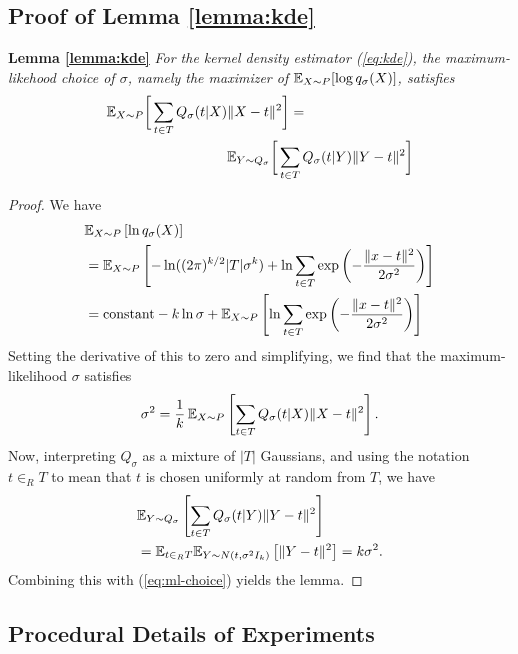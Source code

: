\subsection{Proof of Lemma \ref{lemma:kde}} 
\label{sec:appendix kde lemma}
\textbf{Lemma \ref{lemma:kde}}
\textit{
For the kernel density estimator (\ref{eq:kde}), the maximum-likehood choice of $\sigma$, namely the maximizer of ${\mathbb E}_{X \sim P}[\log q_\sigma(X)]$, satisfies
\begin{align*}
	{\mathbb E}_{X \sim P} \bigg[ \sum_{t \in T} Q_\sigma(t|X) &\|X - t\|^2 \bigg] = \\
	&{\mathbb E}_{Y \sim Q_\sigma} \bigg[ \sum_{t \in T} Q_\sigma(t|Y) \|Y - t\|^2 \bigg]
\end{align*}
}
\begin{proof}
We have
\begin{align*}
&{\mathbb E}_{X \sim P} \left[ \ln q_\sigma(X) \right]  \\
&= {\mathbb E}_{X \sim P} \left[ - \ln ((2\pi)^{k/2}|T| \sigma^k) + \ln \sum_{t \in T} \exp\left( -\frac{\|x-t\|^2}{2 \sigma^2}\right)  \right] \\
&=
\mbox{constant} - k \ln \sigma + {\mathbb E}_{X \sim P} \left[\ln \sum_{t \in T} \exp\left( -\frac{\|x-t\|^2}{2 \sigma^2}\right) \right] 
\end{align*}
Setting the derivative of this to zero and simplifying, we find that the maximum-likelihood $\sigma$ satisfies
\begin{equation}
\sigma^2 = \frac{1}{k} \, {\mathbb E}_{X \sim P} \left[ \sum_{t \in T} Q_\sigma(t|X) \|X - t\|^2 \right] .
\label{eq:ml-choice}
\end{equation}
Now, interpreting $Q_\sigma$ as a mixture of $|T|$ Gaussians, and using the notation $t \in_R T$ to mean that $t$ is chosen uniformly at random from $T$, we have
\begin{align*}
	&{\mathbb E}_{Y \sim Q_\sigma} \left[ \sum_{t \in T} Q_\sigma(t|Y) \|Y - t\|^2 \right] \\
	&={\mathbb E}_{t \in_R T} {\mathbb E}_{Y \sim N(t, \sigma^2 I_k)} \left[ \|Y - t\|^2 \right] 
	= k \sigma^2 .
\end{align*}
Combining this with (\ref{eq:ml-choice}) yields the lemma.
\end{proof}

\subsection{Procedural Details of Experiments}

